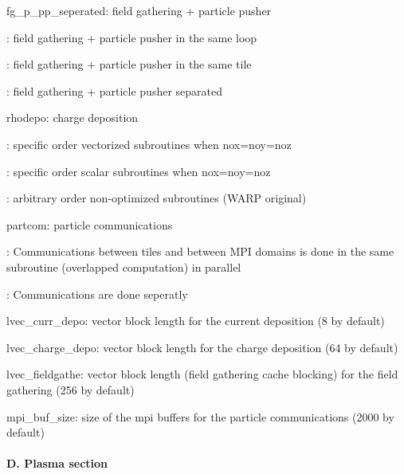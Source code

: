 \begin{DoxyItemize}
\item {\ttfamily fg\+\_\+p\+\_\+pp\+\_\+seperated}\+: field gathering + particle pusher
\begin{DoxyItemize}
\item {}\+: field gathering + particle pusher in the same loop
\item {}\+: field gathering + particle pusher in the same tile
\item {}\+: field gathering + particle pusher separated
\end{DoxyItemize}
\item {\ttfamily rhodepo}\+: charge deposition
\begin{DoxyItemize}
\item {}\+: specific order vectorized subroutines when {\ttfamily nox=noy=noz}
\item {}\+: specific order scalar subroutines when {\ttfamily nox=noy=noz}
\item {}\+: arbitrary order non-\/optimized subroutines (W\+A\+RP original)
\end{DoxyItemize}
\item {\ttfamily partcom}\+: particle communications
\begin{DoxyItemize}
\item {}\+: Communications between tiles and between M\+PI domains is done in the same subroutine (overlapped computation) in parallel
\item {}\+: Communications are done seperatly
\end{DoxyItemize}
\item {\ttfamily lvec\+\_\+curr\+\_\+depo}\+: vector block length for the current deposition (8 by default)
\item {\ttfamily lvec\+\_\+charge\+\_\+depo}\+: vector block length for the charge deposition (64 by default)
\item {\ttfamily lvec\+\_\+fieldgathe}\+: vector block length (field gathering cache blocking) for the field gathering (256 by default)
\item {\ttfamily mpi\+\_\+buf\+\_\+size}\+: size of the mpi buffers for the particle communications (2000 by default)
\end{DoxyItemize}

\paragraph*{D. Plasma section}

